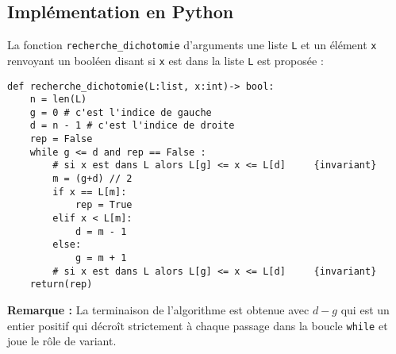  

\subsection{Implémentation en Python}
La fonction \lstinline{recherche_dichotomie} d'arguments une liste \lstinline{L} et un élément \lstinline{x} renvoyant un booléen disant si \lstinline{x} est dans la liste \lstinline{L} est proposée :


\begin{lstlisting}
def recherche_dichotomie(L:list, x:int)-> bool:
    n = len(L)
    g = 0 # c'est l'indice de gauche
    d = n - 1 # c'est l'indice de droite
    rep = False
    while g <= d and rep == False :
        # si x est dans L alors L[g] <= x <= L[d]     {invariant}
        m = (g+d) // 2 
        if x == L[m]:
            rep = True
        elif x < L[m]:
            d = m - 1
        else:
            g = m + 1
        # si x est dans L alors L[g] <= x <= L[d]     {invariant}
    return(rep)
\end{lstlisting} 



\textbf{Remarque :} La terminaison de l'algorithme est obtenue avec $d-g$ qui est un entier positif qui décro\^{i}t strictement à chaque passage dans la boucle \lstinline{while} et joue le rôle de variant.

